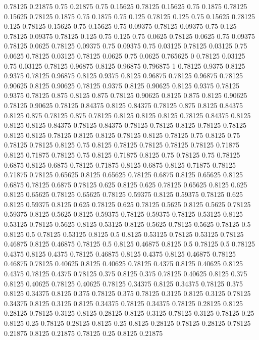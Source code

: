0.78125 0.21875
0.75 0.21875
0.75 0.15625
0.78125 0.15625
0.75 0.1875
0.78125 0.15625
0.78125 0.1875
0.75 0.1875
0.75 0.125
0.78125 0.125
0.75 0.15625
0.78125 0.125
0.78125 0.15625
0.75 0.15625
0.75 0.09375
0.78125 0.09375
0.75 0.125
0.78125 0.09375
0.78125 0.125
0.75 0.125
0.75 0.0625
0.78125 0.0625
0.75 0.09375
0.78125 0.0625
0.78125 0.09375
0.75 0.09375
0.75 0.03125
0.78125 0.03125
0.75 0.0625
0.78125 0.03125
0.78125 0.0625
0.75 0.0625
0.765625 0
0.78125 0.03125
0.75 0.03125
0.78125 0.96875
0.8125 0.96875
0.796875 1
0.78125 0.9375
0.8125 0.9375
0.78125 0.96875
0.8125 0.9375
0.8125 0.96875
0.78125 0.96875
0.78125 0.90625
0.8125 0.90625
0.78125 0.9375
0.8125 0.90625
0.8125 0.9375
0.78125 0.9375
0.78125 0.875
0.8125 0.875
0.78125 0.90625
0.8125 0.875
0.8125 0.90625
0.78125 0.90625
0.78125 0.84375
0.8125 0.84375
0.78125 0.875
0.8125 0.84375
0.8125 0.875
0.78125 0.875
0.78125 0.8125
0.8125 0.8125
0.78125 0.84375
0.8125 0.8125
0.8125 0.84375
0.78125 0.84375
0.78125 0.78125
0.8125 0.78125
0.78125 0.8125
0.8125 0.78125
0.8125 0.8125
0.78125 0.8125
0.78125 0.75
0.8125 0.75
0.78125 0.78125
0.8125 0.75
0.8125 0.78125
0.78125 0.78125
0.78125 0.71875
0.8125 0.71875
0.78125 0.75
0.8125 0.71875
0.8125 0.75
0.78125 0.75
0.78125 0.6875
0.8125 0.6875
0.78125 0.71875
0.8125 0.6875
0.8125 0.71875
0.78125 0.71875
0.78125 0.65625
0.8125 0.65625
0.78125 0.6875
0.8125 0.65625
0.8125 0.6875
0.78125 0.6875
0.78125 0.625
0.8125 0.625
0.78125 0.65625
0.8125 0.625
0.8125 0.65625
0.78125 0.65625
0.78125 0.59375
0.8125 0.59375
0.78125 0.625
0.8125 0.59375
0.8125 0.625
0.78125 0.625
0.78125 0.5625
0.8125 0.5625
0.78125 0.59375
0.8125 0.5625
0.8125 0.59375
0.78125 0.59375
0.78125 0.53125
0.8125 0.53125
0.78125 0.5625
0.8125 0.53125
0.8125 0.5625
0.78125 0.5625
0.78125 0.5
0.8125 0.5
0.78125 0.53125
0.8125 0.5
0.8125 0.53125
0.78125 0.53125
0.78125 0.46875
0.8125 0.46875
0.78125 0.5
0.8125 0.46875
0.8125 0.5
0.78125 0.5
0.78125 0.4375
0.8125 0.4375
0.78125 0.46875
0.8125 0.4375
0.8125 0.46875
0.78125 0.46875
0.78125 0.40625
0.8125 0.40625
0.78125 0.4375
0.8125 0.40625
0.8125 0.4375
0.78125 0.4375
0.78125 0.375
0.8125 0.375
0.78125 0.40625
0.8125 0.375
0.8125 0.40625
0.78125 0.40625
0.78125 0.34375
0.8125 0.34375
0.78125 0.375
0.8125 0.34375
0.8125 0.375
0.78125 0.375
0.78125 0.3125
0.8125 0.3125
0.78125 0.34375
0.8125 0.3125
0.8125 0.34375
0.78125 0.34375
0.78125 0.28125
0.8125 0.28125
0.78125 0.3125
0.8125 0.28125
0.8125 0.3125
0.78125 0.3125
0.78125 0.25
0.8125 0.25
0.78125 0.28125
0.8125 0.25
0.8125 0.28125
0.78125 0.28125
0.78125 0.21875
0.8125 0.21875
0.78125 0.25
0.8125 0.21875
